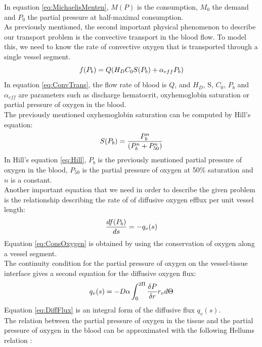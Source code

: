 %
In equation \ref{eq:MichaelisMenten}, $M(P)$ is the consumption, $M_0$ the demand and $P_0$ the partial pressure at half-maximal consumption.
\\As previously mentioned, the second important physical phenomenon to describe our transport problem is the convective transport in the blood flow. To model this, we need to know the rate of convective oxygen that is transported through a single vessel segment.
\begin{equation}
\\f(P_b) = Q(H_DC_0S(P_b) + \alpha_{eff}P_b)
\label{eq:ConvTrans}
\end{equation}
%
In equation \ref{eq:ConvTrans}, the flow rate of blood is $Q$, and $H_D$, S, $C_0$, $P_b$ and $\alpha_{eff}$ are parameters such as discharge hematocrit, oxyhemoglobin saturation or partial pressure of oxygen in the blood.
\\The previously mentioned oxyhemoglobin saturation can be computed by Hill's equation:
\begin{equation}
\\S(P_b) = \frac{P_b^n}{(P_b^n+P_{50}^n)}
\label{eq:Hill}
\end{equation}
In Hill's equation \ref{eq:Hill}, $P_b$ is the previously mentioned partial pressure of oxygen in the blood, $P_{50}$ is the partial pressure of oxygen at 50\% saturation and $n$ is a constant.
%
\\Another important equation that we need in order to describe the given problem is the relationship describing the rate of of diffusive oxygen efflux per unit vessel length:
\begin{equation}
\\ \frac{df(P_b)}{ds} = -q_v(s)
\label{eq:ConsOxygen}
\end{equation}
Equation \ref{eq:ConsOxygen} is obtained by using the conservation of oxygen along a vessel segment.
%
\\The continuity condition for the partial pressure of oxygen on the vessel-tissue interface gives a second equation for the diffusive oxygen flux:
\begin{equation}
\\q_v(s) = -D\alpha \int_{0}^{2\Pi} 
\frac{\delta P}{\delta r}r_v d \Theta
\label{eq:DiffFlux}
\end{equation}
Equation \ref{eq:DiffFlux} is an integral form of the diffusive flux $q_v(s)$.
%
\\The relation between the partial pressure of oxygen in the tissue and the partial pressure of oxygen in the blood can be approximated with the following  Hellums relation \cite{hellums1977resistance}:
